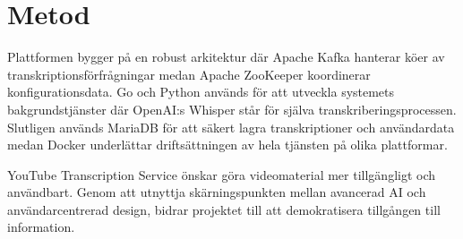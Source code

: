 \section{Metod}
Plattformen bygger på en robust arkitektur där Apache Kafka hanterar köer av transkriptionsförfrågningar medan Apache ZooKeeper koordinerar konfigurationsdata. Go och Python används för att utveckla systemets bakgrundstjänster där OpenAI:s Whisper står för själva transkriberingsprocessen. Slutligen används MariaDB för att säkert lagra transkriptioner och användardata medan Docker underlättar driftsättningen av hela tjänsten på olika plattformar.

YouTube Transcription Service önskar göra videomaterial mer tillgängligt och användbart. Genom att utnyttja skärningspunkten mellan avancerad AI och användarcentrerad design, bidrar projektet till att demokratisera tillgången till information.
